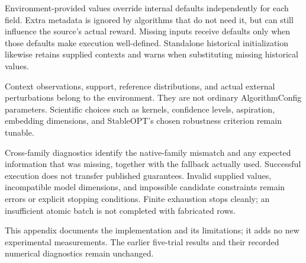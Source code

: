 \documentclass[10pt,a4paper]{article}
\begin{document}
Environment-provided values override internal defaults independently for each field. Extra metadata is ignored by algorithms that do not need it,\allowbreak{} but can still influence the source's actual reward. Missing inputs receive defaults only when those defaults make execution well-defined. Standalone historical initialization likewise retains supplied contexts and warns when substituting missing historical values.


Context observations,\allowbreak{} support,\allowbreak{} reference distributions,\allowbreak{} and actual external perturbations belong to the environment. They are not ordinary AlgorithmConfig parameters. Scientific choices such as kernels,\allowbreak{} confidence levels,\allowbreak{} aspiration,\allowbreak{} embedding dimensions,\allowbreak{} and StableOPT's chosen robustness criterion remain tunable.


Cross-family diagnostics identify the native-family mismatch and any expected information that was missing,\allowbreak{} together with the fallback actually used. Successful execution does not transfer published guarantees. Invalid supplied values,\allowbreak{} incompatible model dimensions,\allowbreak{} and impossible candidate constraints remain errors or explicit stopping conditions. Finite exhaustion stops cleanly; an insufficient atomic batch is not completed with fabricated rows.


This appendix documents the implementation and its limitations; it adds no new experimental measurements. The earlier five-trial results and their recorded numerical diagnostics remain unchanged.
\end{document}
